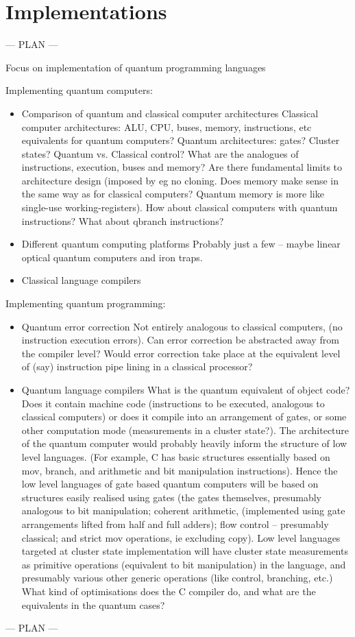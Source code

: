 \section{Implementations}\label{Implementations}

--- PLAN ---

Focus on implementation of quantum programming languages

Implementing quantum computers:
\begin{itemize}
\item Comparison of quantum and classical computer architectures
Classical computer architectures: ALU, CPU, buses, memory, instructions, etc equivalents for quantum computers? Quantum architectures: gates? Cluster states? Quantum vs. Classical control? What are the analogues of instructions, execution, buses and memory? Are there fundamental limits to architecture design (imposed by eg no cloning. Does memory make sense in the same way as for classical computers? Quantum memory is more like single-use working-registers). How about classical computers with quantum instructions? What about qbranch instructions?   
\item Different quantum computing platforms 
Probably just a few -- maybe linear optical quantum computers and iron traps. 
\item Classical language compilers
\end{itemize}
Implementing quantum programming:
\begin{itemize}
\item Quantum error correction
Not entirely analogous to classical computers, (no instruction execution errors). Can error correction be abstracted away from the compiler level? Would error correction take place at the equivalent level of (say) instruction pipe lining in a classical processor?    
\item Quantum language compilers
What is the quantum equivalent of object code? Does it contain machine code (instructions to be executed, analogous to classical computers) or does it compile into an arrangement of gates, or some other computation mode (measurements in a cluster state?). The architecture of the quantum computer would probably heavily inform the structure of low level languages. (For example, C has basic structures essentially based on mov, branch, and arithmetic and bit manipulation instructions). Hence the low level languages of gate based quantum computers will be based on structures easily realised using gates (the gates themselves, presumably analogous to bit manipulation; coherent arithmetic, (implemented using gate arrangements lifted from half and full adders); flow control -- presumably classical; and strict mov operations, ie excluding copy). Low level languages targeted at cluster state implementation will have cluster state measurements as primitive operations (equivalent to bit manipulation) in the language, and presumably various other generic operations (like control, branching, etc.) What kind of optimisations does the C compiler do, and what are the equivalents in the quantum cases? 
\end{itemize}
--- PLAN ---

